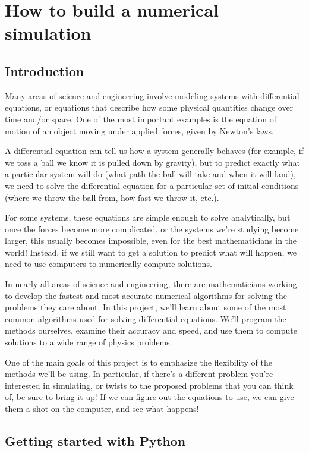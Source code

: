\documentclass[main.tex]{subfiles}
\begin{document}
\chapter{How to build a numerical simulation}

\section{Introduction}

Many areas of science and engineering involve modeling systems with differential equations, or equations that describe how some physical quantities change over time and/or space.
One of the most important examples is the equation of motion of an object moving under applied forces, given by Newton's laws.

A differential equation can tell us how a system generally behaves (for example, if we toss a ball we know it is pulled down by gravity), but to predict exactly what a particular system will do (what path the ball will take and when it will land), we need to solve the differential equation for a particular set of initial conditions (where we throw the ball from, how fast we throw it, etc.).

For some systems, these equations are simple enough to solve analytically, but once the forces become more complicated, or the systems we're studying become larger, this usually becomes impossible, even for the best mathematicians in the world!
Instead, if we still want to get a solution to predict what will happen, we need to use computers to numerically compute solutions.

In nearly all areas of science and engineering, there are mathematicians working to develop the fastest and most accurate numerical algorithms for solving the problems they care about.
In this project, we'll learn about some of the most common algorithms used for solving differential equations.
We'll program the methods ourselves, examine their accuracy and speed, and use them to compute solutions to a wide range of physics problems.

One of the main goals of this project is to emphasize the flexibility of the methods we'll be using.
In particular, if there's a different problem you're interested in simulating, or twists to the proposed problems that you can think of, be sure to bring it up!
If we can figure out the equations to use, we can give them a shot on the computer, and see what happens!

\section{Getting started with Python}
\end{document}
